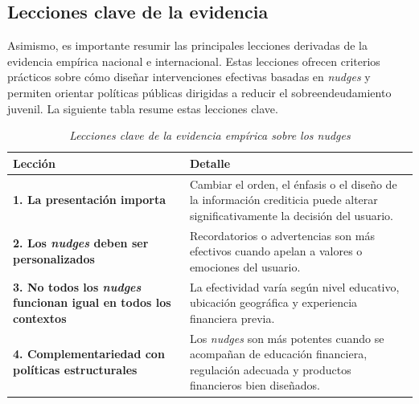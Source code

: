 \documentclass[10pt]{article}
\begin{document}
\begin{multicols}{2}
\subsection{Lecciones clave de la evidencia}

Asimismo, es importante resumir las principales lecciones derivadas de la evidencia empírica nacional e internacional. Estas lecciones ofrecen criterios prácticos sobre cómo diseñar intervenciones efectivas basadas en \textit{nudges} y permiten orientar políticas públicas dirigidas a reducir el sobreendeudamiento juvenil. La siguiente tabla resume estas lecciones clave.

\begin{table}[H]
\centering
\caption{\textit{Lecciones clave de la evidencia empírica sobre los nudges}}
\begin{tabular}{p{3cm} p{4cm}}
\toprule
\textbf{Lección} & \textbf{Detalle} \\
\midrule
\textbf{1. La presentación importa} & Cambiar el orden, el énfasis o el diseño de la información crediticia puede alterar significativamente la decisión del usuario. \\
\addlinespace
\textbf{2. Los \textit{nudges} deben ser personalizados} & Recordatorios o advertencias son más efectivos cuando apelan a valores o emociones del usuario. \\
\addlinespace
\textbf{3. No todos los \textit{nudges} funcionan igual en todos los contextos} & La efectividad varía según nivel educativo, ubicación geográfica y experiencia financiera previa. \\
\addlinespace
\textbf{4. Complementariedad con políticas estructurales} & Los \textit{nudges} son más potentes cuando se acompañan de educación financiera, regulación adecuada y productos financieros bien diseñados. \\
\bottomrule
\end{tabular}
\label{tab:lecciones-nudges}
\end{table}


\end{multicols}
\end{document}
